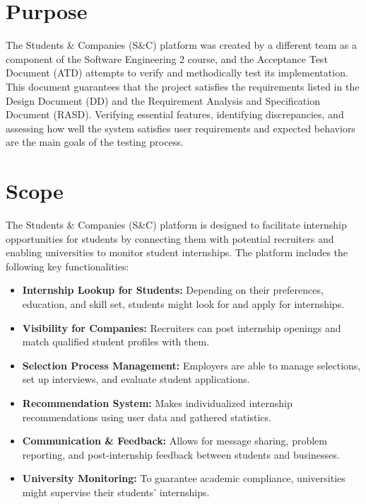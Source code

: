\section{Purpose}
\label{sec:purpose}%
The Students \& Companies (S\&C) platform was created by a different team as a component of the Software Engineering 2 course, and the Acceptance Test Document (ATD) attempts to verify and methodically test its implementation. This document guarantees that the project satisfies the requirements listed in the Design Document (DD) and the Requirement Analysis and Specification Document (RASD). Verifying essential features, identifying discrepancies, and assessing how well the system satisfies user requirements and expected behaviors are the main goals of the testing process.


\section{Scope}
\label{subsec:scope}%
\setcounter{g}{1}
\newcommand{\cg}{\theg\stepcounter{g}}

The Students \& Companies (S\&C) platform is designed to facilitate internship opportunities for students by connecting them with potential recruiters and enabling universities to monitor student internships. The platform includes the following key functionalities:
\begin{itemize}
    \item \textbf{Internship Lookup for Students:} Depending on their preferences, education, and skill set, students might look for and apply for internships.
    \item \textbf{Visibility for Companies:} Recruiters can post internship openings and match qualified student profiles with them.
    \item \textbf{Selection Process Management:} Employers are able to manage selections, set up interviews, and evaluate student applications.
    \item \textbf{Recommendation System:} Makes individualized internship recommendations using user data and gathered statistics.
     \item \textbf{Communication \& Feedback:} Allows for message sharing, problem reporting, and post-internship feedback between students and businesses.
     \item \textbf{University Monitoring:} To guarantee academic compliance, universities might supervise their students' internships.
\end{itemize}

